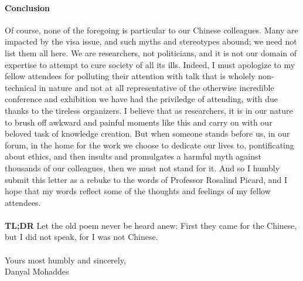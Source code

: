 \documentclass[a4paper,12pt]{article}
\begin{document}
\paragraph{Conclusion}Of course, none of the foregoing is particular to our Chinese colleagues. Many are impacted by the visa issue, and such myths and stereotypes abound; we need not list them all here. We are researchers, not politicians, and it is not our domain of expertise to attempt to cure society of all its ills. Indeed, I must apologize to my fellow attendees for polluting their attention with talk that is wholely non-technical in nature and not at all representative of the otherwise incredible conference and exhibition we have had the priviledge of attending, with due thanks to the tireless organizers. I believe that as researchers, it is in our nature to brush off awkward and painful moments like this and carry on with our beloved task of knowledge creation. But when someone stands before us, in our forum, in the home for the work we choose to dedicate our lives to, pontificating about ethics, and then insults and promulgates a harmful myth against thousands of our colleagues, then we must not stand for it. And so I humbly submit this letter as a rebuke to the words of Professor Rosalind Picard, and I hope that my words reflect some of the thoughts and feelings of my fellow attendees.
\\ \\
\noindent \textbf{TL;DR} Let the old poem never be heard anew: First they came for the Chinese, but I did not speak, for I was not Chinese.
\\ \\
\noindent Yours most humbly and sincerely,\\
\noindent Danyal Mohaddes
\end{document}
